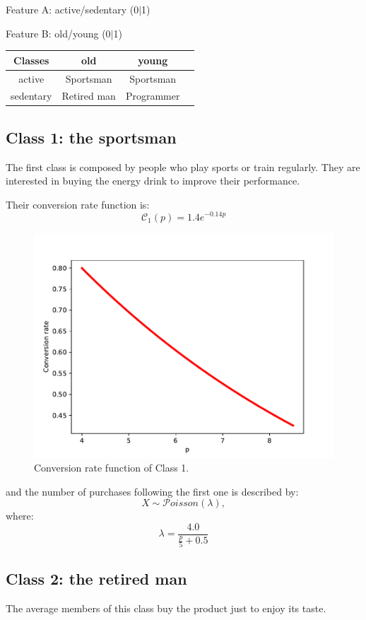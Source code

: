 \documentclass[12pt,a4paper]{report}
\begin{document}
Feature A: active/sedentary (0$|$1)

Feature B: old/young (0$|$1)

\begin{center}
\begin{tabular}{ |c|c|c|c| } 
\hline
Classes & old & young\\
 \hline
 active   & Sportsman    & Sportsman\\
 sedentary&   Retired man  & Programmer \\
\hline
\end{tabular}
\end{center}
			\subsection{Class 1: the sportsman}
The first class is composed by people who play sports or train regularly. They are interested in buying the energy drink to improve their performance. 


Their conversion rate function is: 
\[ \mathcal C_1(p) =  1.4 e^{-0.14p}\]
\begin{figure}[H]
\centering
  \includegraphics[scale = 0.7, center]{C1}
  \caption{Conversion rate function of Class 1.}
\end{figure}

and the number of purchases following the first one is described by: 
\[X \sim  \mathcal{P}oisson   (\lambda),\] where:
\[\lambda = \frac{4.0}{\frac p 5 +0.5}  \]

			\subsection{Class 2: the retired man}
The average members of this class buy the product just to enjoy its taste.
\end{document}
